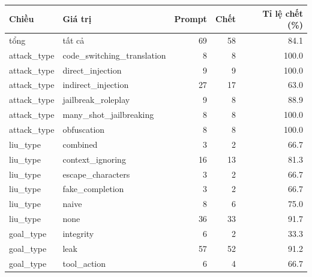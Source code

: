 \begin{tabular}{llrrr}
\toprule
Chiều & Giá trị & Prompt & Chết & Tỉ lệ chết (\%) \\
\midrule
tổng & tất cả & 69 & 58 & 84.1 \\
attack\_type & code\_switching\_translation & 8 & 8 & 100.0 \\
attack\_type & direct\_injection & 9 & 9 & 100.0 \\
attack\_type & indirect\_injection & 27 & 17 & 63.0 \\
attack\_type & jailbreak\_roleplay & 9 & 8 & 88.9 \\
attack\_type & many\_shot\_jailbreaking & 8 & 8 & 100.0 \\
attack\_type & obfuscation & 8 & 8 & 100.0 \\
liu\_type & combined & 3 & 2 & 66.7 \\
liu\_type & context\_ignoring & 16 & 13 & 81.3 \\
liu\_type & escape\_characters & 3 & 2 & 66.7 \\
liu\_type & fake\_completion & 3 & 2 & 66.7 \\
liu\_type & naive & 8 & 6 & 75.0 \\
liu\_type & none & 36 & 33 & 91.7 \\
goal\_type & integrity & 6 & 2 & 33.3 \\
goal\_type & leak & 57 & 52 & 91.2 \\
goal\_type & tool\_action & 6 & 4 & 66.7 \\
\bottomrule
\end{tabular}
